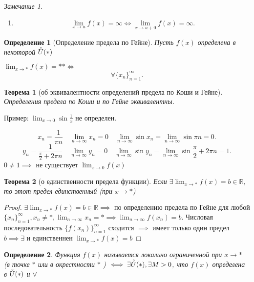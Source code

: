 \documentclass[a4paper,12pt]{article} %
\newtheorem{definition}{Определение}[subsection]
\newtheorem{theorem}{Теорема}[subsection]
\theoremstyle{remark}
\newtheorem*{remark}{Замечание}
\begin{document}
\begin{remark}
	\begin{enumerate}
		\item \[
		\lim_{x \to a} f(x) = \infty \iff \lim_{x \to a+0} f(x) = \infty
		.\] 
	\end{enumerate}
\end{remark}

\begin{definition}[Определение предела по Гейне]
	Пусть $f(x)$ определена в некоторой $\accentset{\circ}{U}(*) $

	$\lim_{x \to *} f(x) = ** \iff$
	\[
	\forall \{x_n\}_{n=1}^{\infty}
	.\] 
\end{definition}

\begin{theorem}[об эквивалентности определений предела по Коши и Гейне]
	Определения предела по Коши и по Гейне эквивалентны.
\end{theorem}
Пример:
$\lim_{x \to 0} \sin{\frac{1}{x}}$ не определен.

\[
	x_n = \frac{1}{\pi n} \quad \lim_{n \to \infty} x_n = 0 \quad \lim_{n \to \infty} \sin{x_n} = \lim_{n \to \infty} \sin{\pi n} = 0
.\] 
\[
	y_n = \frac{1}{\frac{\pi}{2} + 2\pi n} \quad \lim_{n \to \infty} y_n = 0 \quad \lim_{n \to \infty} \sin{y_n} = \lim_{n \to \infty} \sin{\frac{\pi}{2} + 2\pi n} = 1
.\] 
$0 \neq 1 \implies$ не существует $\lim_{x \to 0} f(x)$

\begin{theorem}[о единственности предела функции]
	Если $\exists \lim_{x \to *} f(x) = b \in  \mathbb{R}$, то этот предел единственный (при $x \to *$)
\end{theorem}
\begin{proof}
	$\exists  \lim_{x \to *} f(x) = b \in \mathbb{R} \implies$ по определению предела по Гейне для любой $\{x_n\}_{n=1}^{\infty}, x_n \neq  *, \lim_{n \to \infty} x_n = * \implies \lim_{n \to \infty} f(x_n) = b$. Числовая последовательность $\{f(x_n)\}_{n=1}^{\infty}$ сходится $\implies$ имеет только один предел $b \implies \exists $ и единственнен $\lim_{x \to *} f(x) = b$
\end{proof}

\begin{definition}
	Функция $f(x)$ называется локально ограниченной при  $x \to *$ (в точке $*$ или в окрестности $*$ ) $\iff \exists \accentset{\circ}{U}(*), \exists M>0$, что $f(x)$ определена в  $\accentset{\circ}{U}(*) $ и $\forall $
\end{definition}
\end{document}
